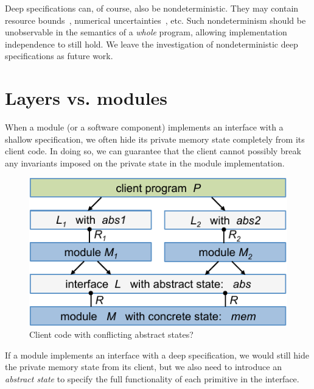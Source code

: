 Deep specifications can, of course, also be nondeterministic. They may
contain resource bounds~\cite{veristack}, numerical
uncertainties~\cite{chaudhuri10}, etc. Such nondeterminism should
be unobservable in the semantics of a {\em whole} program,
allowing implementation independence to still hold.  We leave the
investigation of nondeterministic deep specifications as future work.


\section{Layers vs. modules} 
When a module (or a software component)
implements an interface with a shallow specification, 
we often hide its private memory state completely
from its client code. In doing so, we can guarantee that the client
cannot possibly break any invariants imposed on the private state
in the module implementation.

\begin{figure}[t]
\begin{center}
\includegraphics[scale=.7]{figs/conflict}
\caption{Client code with conflicting abstract states?}
\label{fig:conflict}
\end{center}
\end{figure}

If a module implements an interface with a deep specification, we
would still hide the private memory state from its client, but we also
need to introduce an {\em abstract state} to specify
the full functionality of each primitive in the interface. 

